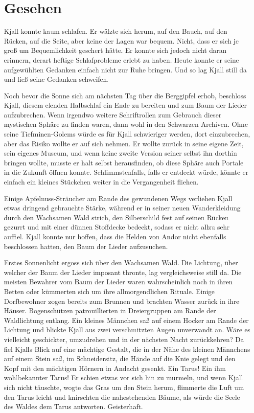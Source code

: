 \documentclass[10pt, a4paper, oneside]{book}
\begin{document}
\newpage
\section{Gesehen}


Kjall konnte kaum schlafen. Er wälzte sich herum, auf den Bauch, auf den Rücken, auf die Seite, aber keine der Lagen war bequem. Nicht, dass er sich je groß um Bequemlichkeit geschert hätte. Er konnte sich jedoch nicht daran erinnern, derart heftige Schlafprobleme erlebt zu haben. Heute konnte er seine aufgewühlten Gedanken einfach nicht zur Ruhe bringen. Und so lag Kjall still da und ließ seine Gedanken schweifen.

Noch bevor die Sonne sich am nächsten Tag über die Berggipfel erhob, beschloss Kjall, diesem elenden Halbschlaf ein Ende zu bereiten und zum Baum der Lieder aufzubrechen. Wenn irgendwo weitere Schriftrollen zum Gebrauch dieser mystischen Sphäre zu finden waren, dann wohl in den Schwarzen Archiven. Ohne seine Tiefminen-Golems würde es für Kjall schwieriger werden, dort einzubrechen, aber das Risiko wollte er auf sich nehmen. Er wollte zurück in seine eigene Zeit, sein eigenes Museum, und wenn keine zweite Version seiner selbst ihn dorthin bringen wollte, musste er halt selbst herausfinden, ob diese Sphäre auch Portale in die Zukunft öffnen konnte. Schlimmstenfalls, falls er entdeckt würde, könnte er einfach ein kleines Stückchen weiter in die Vergangenheit fliehen.

Einige Apfelnuss-Sträucher am Rande des gewundenen Wegs verliehen Kjall etwas dringend gebrauchte Stärke, während er in seiner neuen Wanderkleidung durch den Wachsamen Wald strich, den Silberschild fest auf seinen Rücken gezurrt und mit einer dünnen Stoffdecke bedeckt, sodass er nicht allzu sehr auffiel. Kjall konnte nur hoffen, dass die Helden von Andor nicht ebenfalls beschlossen hatten, den Baum der Lieder aufzusuchen.\bigskip



Erstes Sonnenlicht ergoss sich über den Wachsamen Wald. Die Lichtung, über welcher der Baum der Lieder imposant thronte, lag vergleichsweise still da. Die meisten Bewahrer vom Baum der Lieder waren wahrscheinlich noch in ihren Betten oder kümmerten sich um ihre allmorgendlichen Rituale. Einige Dorfbewohner zogen bereits zum Brunnen und brachten Wasser zurück in ihre Häuser. Bogenschützen patrouillierten in Dreiergruppen am Rande der Waldlichtung entlang. Ein kleines Männchen saß auf einem Hocker am Rande der Lichtung und blickte Kjall aus zwei verschmitzten Augen unverwandt an. Wäre es vielleicht geschickter, umzudrehen und in der nächsten Nacht zurückkehren? Da fiel Kjalls Blick auf eine mächtige Gestalt, die in der Nähe des kleinen Männchens auf einem Stein saß, im Schneidersitz, die Hände auf die Knie gelegt und den Kopf mit den mächtigen Hörnern in Andacht gesenkt. Ein Tarus! Ein ihm wohlbekannter Tarus! Er schien etwas vor sich hin zu murmeln, und wenn Kjall sich nicht täuschte, wogte das Gras um den Stein herum, flimmerte die Luft um den Tarus leicht und knirschten die nahestehenden Bäume, als würde die Seele des Waldes dem Tarus antworten. Geisterhaft.
\end{document}
